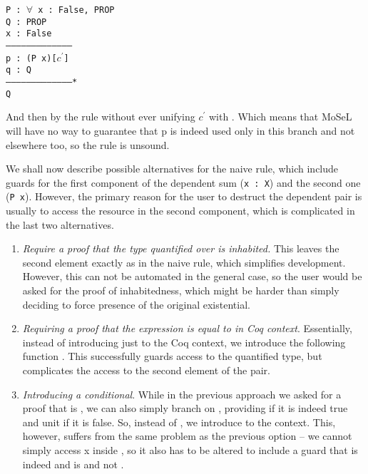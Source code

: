 \begin{minipage}{\linewidth}
\texttt{P : $\forall$ x : False, PROP\\
Q : PROP\\
x : False\\
---------------------------------------\\
p : (P x)[$c^{'}$]\\
q : Q\\
---------------------------------------*\\
Q}
\end{minipage}

And then by the  rule without ever unifying $c^{'}$ with \true.
Which means that MoSeL will have no way to guarantee that p is indeed used only in this branch and not elsewhere too, so the rule is unsound.

We shall now describe possible alternatives for the naive rule, which include guards for the first component of the dependent sum (\texttt{x : X}) and the second one (\texttt{P x}).
However, the primary reason for the user to destruct the dependent pair is usually to access the resource in the second component, which is complicated in the last two alternatives.
\begin{enumerate}
\item \emph{Require a proof that the type quantified over is inhabited.}
  This leaves the second element exactly as in the naive rule, which simplifies development.
  However, this can not be automated in the general case, so the user would be asked for the proof of inhabitedness, which might be harder than simply deciding to force presence of the original existential.
\item \emph{Requiring a proof that the expression is equal to \true in Coq context}.
  Essentially, instead of introducing just  to the Coq context, we introduce the following function .
  This successfully guards access to the quantified type, but complicates the access to the second element of the pair.
\item \emph{Introducing a conditional}.
  While in the previous approach we asked for a proof that  is \true, we can also simply branch on , providing  if it is indeed true and unit if it is false.
  So, instead of , we introduce  to the context.
  This, however, suffers from the same problem as the previous option -- we cannot simply access x inside , so it also has to be altered to include a guard that  is indeed \true and  is  and not .
\end{enumerate}

